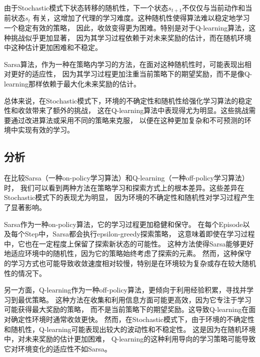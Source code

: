 \documentclass{thuemp}
\begin{document}
由于Stochastic模式下状态转移的随机性，下一个状态$s_{t+1}$不仅仅与当前动作和当前状态$s_t$
有关，这增加了代理的学习难度。这种随机性使得算法难以稳定地学习一个稳定有效的策略，
因此，收敛变得更为困难。特别是对于Q-learning算法，这种挑战似乎更加显著，
因为其学习过程依赖于对未来奖励的估计，而在随机环境中这种估计更加困难和不稳定。

Sarsa算法，作为一种在策略内学习的方法，在面对这种随机性时，可能表现出相对更好的适应性，
因为其学习过程更加注重当前策略下的期望奖励，而不是像Q-learning那样依赖于最大化未来奖励的估计。

总体来说，在Stochastic模式下，环境的不确定性和随机性给强化学习算法的稳定性和收敛带来了额外的挑战，
这在Q-learning算法中表现得尤为明显。这些挑战需要通过改进算法或采用不同的策略来克服，
以便在这种更加复杂和不可预测的环境中实现有效的学习。\\
\vbox{}

\subsection{分析}
在比较Sarsa（一种on-policy学习算法）和Q-learning（一种off-policy学习算法）时，
我们可以看到两种方法在策略学习和探索方式上的根本差异。这些差异在Stochastic模式下的表现尤为明显，
因为环境的不确定性和随机性对学习过程产生了显著影响。

Sarsa作为一种on-policy算法，它的学习过程更加稳健和保守。
在每个Episode以及每个Step中，Sarsa都会执行epsilon-greedy探索策略，
这意味着即使在学习过程中，它也在一定程度上保留了探索新状态的可能性。
这种方法使得Sarsa能够更好地适应环境中的随机性，因为它的策略始终考虑了探索的元素。
然而，这种保守的学习方式也可能导致收敛速度相对较慢，特别是在环境较为复杂或存在较大随机性的情况下。

另一方面，Q-learning作为一种off-policy算法，更倾向于利用经验积累，寻找并学习到最优策略。
这种方法在收集和利用信息方面可能更高效，因为它专注于学习可能获得最大奖励的策略，
而不是当前策略下的期望奖励。这导致Q-learning在面对确定性环境时通常收敛更快。
然而，在Stochastic模式下，由于环境的不确定性和随机性，Q-learning可能表现出较大的波动性和不稳定性。
这是因为在随机环境中，对未来奖励的估计更加困难，
Q-learning的这种利用导向的学习策略可能导致它对环境变化的适应性不如Sarsa。
\end{document}
